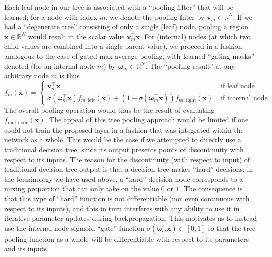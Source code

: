 \documentclass[twoside]{article}
\begin{document}
Each leaf node in our tree is associated with a ``pooling filter'' that will be learned; 
for a node with index $m$, we denote the pooling filter  by $\mathbf{v}_{m} \in \mathbb{R}^N$.
If we had a ``degenerate tree'' consisting of only a single (leaf) node, pooling a region 
$\mathbf{x} \in \mathbb{R}^N$ would result in the scalar value $ \mathbf{v}_{m}^\intercal \mathbf{x}$. 
For (internal) nodes (at which two child values are combined into a single 
parent value), we proceed in a fashion analogous to the case of gated max-average 
pooling, with learned ``gating masks'' denoted (for an internal node $m$) by 
$\boldsymbol{\omega}_{m} \in \mathbb{R}^N$. The ``pooling result'' at any arbitrary
node $m$ is thus 
\vspace{-2mm}
{\tiny
\begin{equation}
   f_{m}(\mathbf{x})=
   \begin{cases}
  \mathbf{v}^\intercal_{m} \mathbf{x} & \text{ if leaf node} \\
   \sigma (\boldsymbol{\omega}^\intercal_{m} \mathbf{x}) f_{{m},\text{left}}({\mathbf{x}}) + (1-\sigma(\boldsymbol{\omega}^\intercal_{m} \mathbf{x})) f_{{m},\text{right}}({\mathbf{x}}) & \text{ if internal node}
   \end{cases}
\end{equation}
}%
The overall pooling operation would thus be the result of evaluating $f_{\text{root\_node}}(\mathbf{x})$.
The appeal of this tree pooling approach would be limited if one could not train the 
proposed layer in a fashion that was integrated within the network as a whole. This
would be the case if we attempted to directly use a traditional decision tree, since
its output presents points of discontinuity with respect to its inputs. The reason 
for the discontinuity (with respect to input) of traditional decision tree output 
is that a decision tree makes ``hard'' decisions; in the terminology we have used above, 
a ``hard'' decision node corresponds to a mixing proportion that can only take on 
the value $0$ or $1$. The consequence is that this type of ``hard'' function is 
not differentiable (nor even continuous with respect to its inputs), and this in 
turn interferes with any ability to use it in iterative parameter updates during 
backpropagation. This motivates us to instead use the internal node sigmoid ``gate''
function $\sigma(\boldsymbol{\omega}_{m}^\intercal \mathbf{x})\in [0, 1]$ so that the tree 
pooling function as a whole will be differentiable with respect to its parameters 
and its inputs. 
\end{document}
